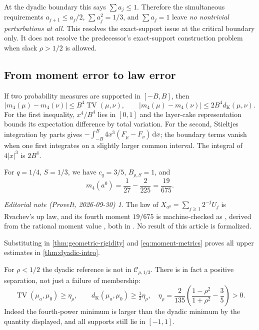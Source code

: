 \documentclass[11pt,a4paper]{article}
\numberwithin{equation}{section}
\theoremstyle{definition}
\theoremstyle{remark}
\newtheorem*{ednote}{Editorial note (ProveIt, 2026-09-30)}
\DeclareMathOperator{\TV}{TV}
\newcommand{\C}{\mathcal C}
\newcommand{\dd}{\,\mathrm d}
\newcommand{\dK}{d_{\mathrm K}}
\begin{document}
At the dyadic boundary this says $\sum a_j\le1$. Therefore the simultaneous
requirements $a_{j+1}\le a_j/2$, $\sum a_j^2=1/3$, and $\sum a_j=1$
leave \emph{no nontrivial perturbations at all}. This resolves the
exact-support issue at the critical boundary only. It does not resolve the
predecessor's exact-support construction problem when slack $\rho>1/2$
is allowed.

\subsection{From moment error to law error}

If two probability measures are supported in $[-B,B]$, then
\begin{equation}
 |m_4(\mu)-m_4(\nu)|\le B^4\TV(\mu,\nu),\qquad
 |m_4(\mu)-m_4(\nu)|\le2B^4\dK(\mu,\nu).
 \label{eq:moment-metrics}
\end{equation}
For the first inequality, $x^4/B^4$ lies in $[0,1]$ and the layer-cake
representation bounds its expectation difference by total variation. For the
second, Stieltjes integration by parts gives
$-\int_{-B}^B4x^3(F_\mu-F_\nu)\dd x$; the boundary terms vanish when one
first integrates on a slightly larger common interval. The integral of
$4|x|^3$ is $2B^4$.

For $q=1/4$, $S=1/3$, we have $c_q=3/5$, $B_{\rho,S}=1$, and
\begin{equation}
 m_4(a^0)=\frac1{27}-\frac2{225}=\frac{19}{675}.
\end{equation}
\begin{ednote}
The law of $X_{a^0}=\sum_{j\ge1}2^{-j}U_j$ is Rvachev's $\mathrm{up}$ law,
and its fourth moment $19/675$ is machine-checked as
, derived from the rational moment value
, both in
.
No result of this article is formalized.
\end{ednote}
Substituting in \cref{thm:geometric-rigidity} and
\eqref{eq:moment-metrics} proves all upper estimates in
\cref{thm:dyadic-intro}.

For $\rho<1/2$ the dyadic reference is not in $\C_{\rho,1/3}$.
There is in fact a positive separation, not just a failure of membership:
\begin{equation}
 \TV(\mu_a,\mu_0)\ge\eta_\rho,
 \qquad \dK(\mu_a,\mu_0)\ge\tfrac12\eta_\rho,
 \quad
 \eta_\rho=\frac2{135}\left(\frac{1-\rho^2}{1+\rho^2}-\frac35\right)>0.
 \label{eq:subcritical-separation}
\end{equation}
Indeed the fourth-power minimum is larger than the dyadic minimum by the
quantity displayed, and all supports still lie in $[-1,1]$.
\end{document}
